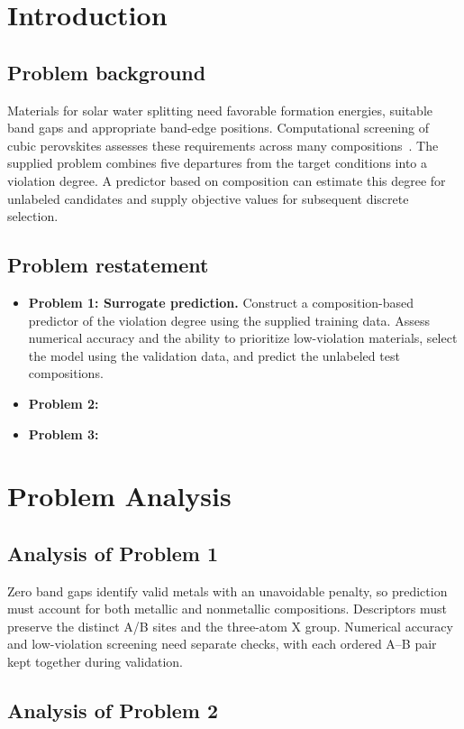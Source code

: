 \section{Introduction}
\subsection{Problem background}
Materials for solar water splitting need favorable formation energies, suitable band gaps and appropriate band-edge positions. Computational screening of cubic perovskites assesses these requirements across many compositions~\cite{castelli2012}. The supplied problem combines five departures from the target conditions into a violation degree. A predictor based on composition can estimate this degree for unlabeled candidates and supply objective values for subsequent discrete selection.

\subsection{Problem restatement}
\begin{itemize}
  \item \textbf{Problem 1: Surrogate prediction.} Construct a composition-based predictor of the violation degree using the supplied training data. Assess numerical accuracy and the ability to prioritize low-violation materials, select the model using the validation data, and predict the unlabeled test compositions.
  \item \textbf{Problem 2:}
  \item \textbf{Problem 3:}
\end{itemize}

\section{Problem Analysis}
\subsection{Analysis of Problem 1}
Zero band gaps identify valid metals with an unavoidable penalty, so prediction must account for both metallic and nonmetallic compositions. Descriptors must preserve the distinct A/B sites and the three-atom X group. Numerical accuracy and low-violation screening need separate checks, with each ordered A--B pair kept together during validation.
\subsection{Analysis of Problem 2}
